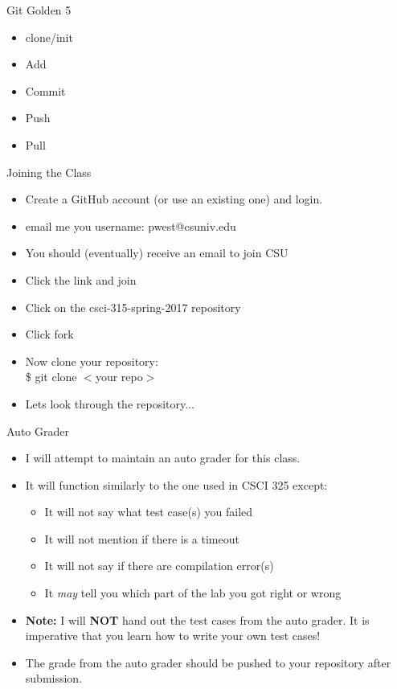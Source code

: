\documentclass{beamer}
\begin{document}
\begin{frame}{Git Golden 5}
\begin{itemize}
\item clone/init
\item Add
\item Commit
\item Push
\item Pull
\end{itemize}
\end{frame}

\begin{frame}{Joining the Class}
\begin{itemize}
\item Create a GitHub account (or use an existing one) and login.
\item email me you username: pwest@csuniv.edu
\item You should (eventually) receive an email to join CSU
\item Click the link and join
\item Click on the csci-315-spring-2017 repository
\item Click fork
\item Now clone your repository:\\
\$ git clone $<$your repo$>$
\item Lets look through the repository...
\end{itemize}
\end{frame}

\begin{frame}{Auto Grader}
\begin{itemize}
\item I will attempt to maintain an auto grader for this class.
\item It will function similarly to the one used in CSCI 325 except:
\begin{itemize}
\item It will not say what test case(s) you failed
\item It will not mention if there is a timeout
\item It will not say if there are compilation error(s)
\item It \textit{may} tell you which part of the lab you got right or wrong
\end{itemize}
\item \textbf{Note:} I will \textbf{NOT} hand out the test cases from the auto grader.  It is imperative that you learn how to write your own test cases!
\item The grade from the auto grader should be pushed to your repository after submission.
\end{itemize}
\end{frame}
\end{document}
